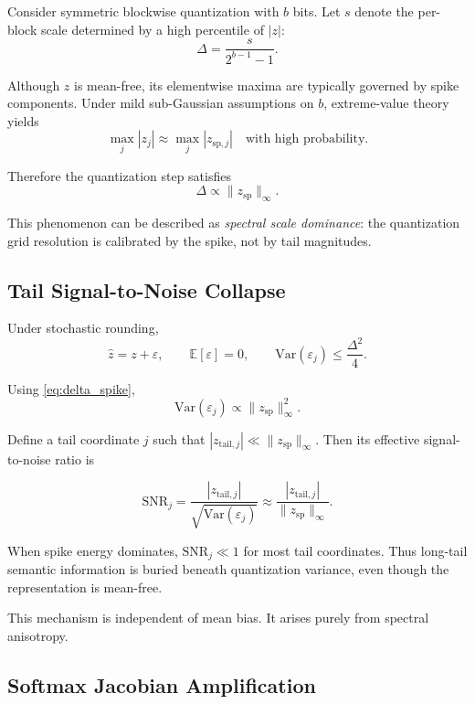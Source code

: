 Consider symmetric blockwise quantization with $b$ bits.
Let $s$ denote the per-block scale determined by a high percentile
of $|z|$:
\[
\Delta = \frac{s}{2^{b-1}-1}.
\]

Although $z$ is mean-free,
its elementwise maxima are typically governed by spike components.
Under mild sub-Gaussian assumptions on $b$,
extreme-value theory yields
\[
\max_j |z_j|
\approx
\max_j |z_{\mathrm{sp},j}|
\quad \text{with high probability.}
\]

Therefore the quantization step satisfies
\begin{equation}
\Delta \propto \|z_{\mathrm{sp}}\|_\infty.
\label{eq:delta_spike}
\end{equation}

This phenomenon can be described as \emph{spectral scale dominance}:
the quantization grid resolution is calibrated by the spike,
not by tail magnitudes.

\subsection{Tail Signal-to-Noise Collapse}

Under stochastic rounding,
\[
\hat z = z + \varepsilon,
\qquad
\mathbb{E}[\varepsilon]=0,
\qquad
\mathrm{Var}(\varepsilon_j) \le \frac{\Delta^2}{4}.
\]

Using \eqref{eq:delta_spike},
\[
\mathrm{Var}(\varepsilon_j)
\propto
\|z_{\mathrm{sp}}\|_\infty^2.
\]

Define a tail coordinate $j$ such that $|z_{\mathrm{tail},j}| \ll \|z_{\mathrm{sp}}\|_\infty$.
Then its effective signal-to-noise ratio is

\begin{equation}
\mathrm{SNR}_j
=
\frac{|z_{\mathrm{tail},j}|}
{\sqrt{\mathrm{Var}(\varepsilon_j)}}
\approx
\frac{|z_{\mathrm{tail},j}|}{\|z_{\mathrm{sp}}\|_\infty}.
\label{eq:tail_snr}
\end{equation}

When spike energy dominates,
$\mathrm{SNR}_j \ll 1$ for most tail coordinates.
Thus long-tail semantic information is buried beneath quantization variance,
even though the representation is mean-free.

This mechanism is independent of mean bias.
It arises purely from spectral anisotropy.

\subsection{Softmax Jacobian Amplification}

